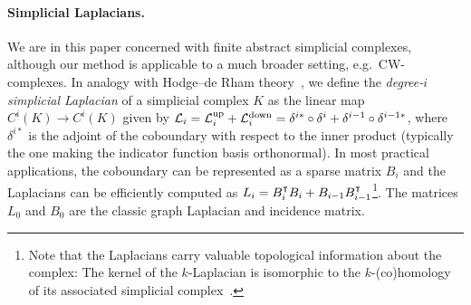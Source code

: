 \paragraph{Simplicial Laplacians.}
We are in this paper concerned with finite abstract simplicial complexes, although our method is applicable to a much broader setting, e.g.\ CW-complexes. In analogy with Hodge--de Rham theory~\cite{madsen1997calculus}, we define the \emph{degree-$i$ simplicial Laplacian} of a simplicial complex $K$ as the linear map $C^i(K)\to C^i(K)$ given by $\mathcal{L}_i = \mathcal{L}^{\text{up}}_i + \mathcal{L}^{\text{down}}_i = \delta^{i\ast}\circ\delta^{i} + \delta^{i-1}\circ\delta^{i-1\ast}$, where $\delta^{i\ast}$ is the adjoint of the coboundary with respect to the inner product (typically the one making the indicator function basis orthonormal). In most practical applications, the coboundary can be represented as a sparse matrix $B_i$ and the Laplacians can be efficiently computed as $L_i=B_i^{\intercal} B_{i}+B_{i-1}B_{i-1}^{\intercal}$\footnote{Note that the Laplacians carry valuable topological information about the complex: The kernel of the $k$-Laplacian is isomorphic to the $k$-(co)homology of its associated simplicial complex~\cite{eckmann1944,horak2013spectra}.}. The matrices $L_0$ and $B_0$ are the classic graph Laplacian and incidence matrix.
